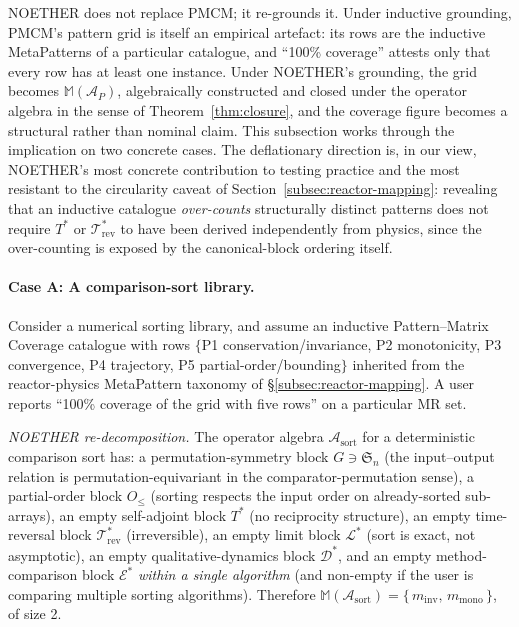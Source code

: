 \documentclass[manuscript]{acmart}
\begin{document}
NOETHER does not replace PMCM; it re-grounds it. Under inductive grounding, PMCM's pattern grid is itself an empirical artefact: its rows are the inductive MetaPatterns of a particular catalogue, and ``100\% coverage'' attests only that every row has at least one instance. Under NOETHER's grounding, the grid becomes $\mathbb{M}(\mathcal{A}_P)$, algebraically constructed and closed under the operator algebra in the sense of Theorem~\ref{thm:closure}, and the coverage figure becomes a structural rather than nominal claim. This subsection works through the implication on two concrete cases. The deflationary direction is, in our view, NOETHER's most concrete contribution to testing practice and the most resistant to the circularity caveat of Section~\ref{subsec:reactor-mapping}: revealing that an inductive catalogue \emph{over-counts} structurally distinct patterns does not require $T^{*}$ or $\mathcal{T}^{*}_{\mathrm{rev}}$ to have been derived independently from physics, since the over-counting is exposed by the canonical-block ordering itself.

\paragraph{Case A: A comparison-sort library.}
Consider a numerical sorting library, and assume an inductive Pattern--Matrix Coverage catalogue with rows $\{$P1 conservation/invariance, P2 monotonicity, P3 convergence, P4 trajectory, P5 partial-order/bounding$\}$ inherited from the reactor-physics MetaPattern taxonomy of \S\ref{subsec:reactor-mapping}. A user reports ``100\% coverage of the grid with five rows'' on a particular MR set.

\noindent \emph{NOETHER re-decomposition.} The operator algebra $\mathcal{A}_{\mathrm{sort}}$ for a deterministic comparison sort has: a permutation-symmetry block $G \ni \mathfrak{S}_n$ (the input--output relation is permutation-equivariant in the comparator-permutation sense), a partial-order block $O_{\le}$ (sorting respects the input order on already-sorted sub-arrays), an empty self-adjoint block $T^{*}$ (no reciprocity structure), an empty time-reversal block $\mathcal{T}^{*}_{\mathrm{rev}}$ (irreversible), an empty limit block $\mathcal{L}^{*}$ (sort is exact, not asymptotic), an empty qualitative-dynamics block $\mathcal{D}^{*}$, and an empty method-comparison block $\mathcal{E}^{*}$ \emph{within a single algorithm} (and non-empty if the user is comparing multiple sorting algorithms). Therefore $\mathbb{M}(\mathcal{A}_{\mathrm{sort}}) = \{\,m_{\mathrm{inv}},\, m_{\mathrm{mono}}\,\}$, of size 2.
\end{document}
